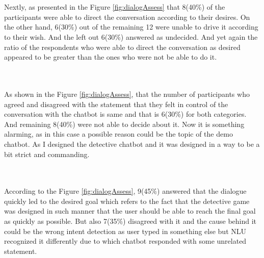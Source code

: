 \\~\\
Nextly, as presented in the Figure \ref{fig:dialogAssess} that 8(40\%) of the participants were able to direct the conversation according to their desires. On the other hand, 6(30\%) out of the remaining 12 were unable to drive it according to their wish. And the left out 6(30\%) answered as undecided. And yet again the ratio of the respondents who were able to direct the conversation as desired appeared to be greater than the ones who were not be able to do it.

\\~\\
As shown in the Figure \ref{fig:dialogAssess}, that the number of participants who agreed and disagreed with the statement that they felt in control of the conversation with the chatbot is same and that is 6(30\%) for both categories. And remaining 8(40\%) were not able to decide about it. Now it is something alarming, as in this case a possible reason could be the topic of the demo chatbot. As I designed the detective chatbot and it was designed in a way to be a bit strict and commanding. 

\\~\\
According to the Figure \ref{fig:dialogAssess}, 9(45\%) answered that the dialogue quickly led to the desired goal which refers to the fact that the detective game was designed in such manner that the user should be able to reach the final goal as quickly as possible. But also 7(35\%) disagreed with it and the cause behind it could be the wrong intent detection as user typed in something else but NLU recognized it differently due to which chatbot responded with some unrelated statement.


